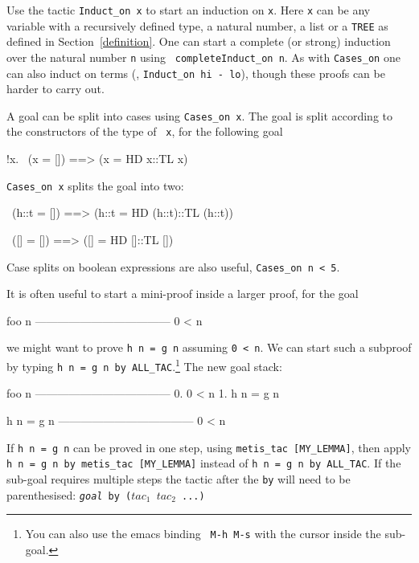 \documentclass[a4paper,10pt]{article}
\begin{document}

Use the tactic {\tt\small Induct\_on \sq x\sq} to start an induction on {\tt\small x}.
Here {\tt x} can be any variable with a recursively defined type,
\eg{} a natural number, a list or a {\tt\small TREE} as defined in
Section~\ref{definition}.  One can start a complete (or strong)
induction over the natural number {\tt\small n} using {\tt\small
  completeInduct\_on \sq n\sq}.
As with \texttt{Cases\_on} one can also induct on terms (\eg, \texttt{\small Induct\_on~\sq hi~-~lo\sq}), though these proofs can be harder to carry out.


A goal can be split into cases using {\tt\small Cases\_on \sq x\sq}. The
goal is split according to the constructors of the type of {\tt\small
  x}, \eg{} for the following goal
\begin{code}
    !x. ~(x = []) ==> (x = HD x::TL x)
\end{code}
{\tt\small Cases\_on \sq x\sq} splits the goal into two:
\begin{code}
    ~(h::t = []) ==> (h::t = HD (h::t)::TL (h::t))

    ~([] = []) ==> ([] = HD []::TL [])
\end{code}
Case splits on boolean expressions are also useful, \eg{} {\tt\small Cases\_on \sq n < 5\sq}.


It is often useful to start a mini-proof inside a larger proof, \eg{} for the goal
\begin{code}
    foo n
    ------------------------------------
      0 < n
\end{code}
we might want to prove {\tt\small h n = g n} assuming {\tt\small 0 <
  n}.
We can start such a subproof by typing {\tt\small \sq h n = g n\sq
  by ALL\_TAC}.\footnote{You can also use the emacs binding {\tt\small
    M-h M-s} with the cursor inside the sub-goal.} The new goal stack:
\begin{code}
    foo n
    ------------------------------------
      0.  0 < n
      1.  h n = g n

    h n = g n
    ------------------------------------
      0 < n
\end{code}
If {\tt\small \sq h n = g n\sq} can be proved in one step, \eg{} using {\tt\small metis\_tac [MY\_LEMMA]}, then
apply {\tt\small \sq h n = g n\sq \ by metis\_tac [MY\_LEMMA]} instead of
{\tt\small \sq h n = g n\sq \ by ALL\_TAC}.  If the sub-goal requires
multiple steps the tactic after the \texttt{by} will need to be
parenthesised: {\tt\small\sq\textit{goal}\sq \ by ($\mathit{tac}_1$ \ml{\gt\gt}
  $\mathit{tac}_2$ ...)}
\end{document}
